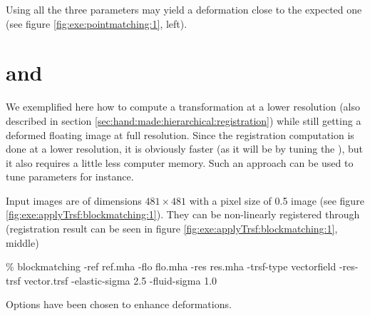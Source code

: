 Using all the three parameters may yield a deformation close to the expected one (see figure \ref{fig:exe:pointmatching:1}, left). 










\section{\applyTrsf and \blockmatching}
\label{sec:example:applyTrsf:blockmatching}

We exemplified here how to compute a transformation at a lower resolution (also described in section \ref{sec:hand:made:hierarchical:registration}) while still getting a deformed floating image at full resolution. Since the registration computation is done at a lower resolution, it is obviously faster (as it will be by tuning the ), but it also requires a little less computer memory. Such an approach can be used to tune parameters for instance.

Input images are of dimensions $481 \times 481$ with a pixel size of 0.5 image (see figure \ref{fig:exe:applyTrsf:blockmatching:1}). They can be non-linearly registered through (registration result can be seen in figure \ref{fig:exe:applyTrsf:blockmatching:1}, middle)
\begin{code}{1}
\% blockmatching -ref ref.mha -flo flo.mha -res res.mha -trsf-type vectorfield -res-trsf vector.trsf -elastic-sigma 2.5 -fluid-sigma 1.0
\end{code}
Options  have been chosen to enhance deformations.

